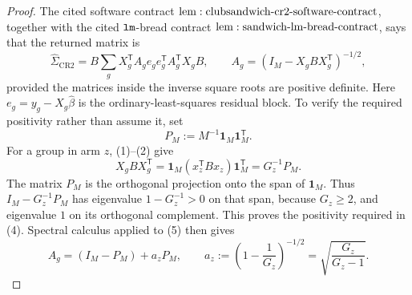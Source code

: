 \documentclass{article}
\begin{document}
\begin{proof}
The cited software contract \({\rm lem:clubsandwich\text{-}cr2\text{-}software\text{-}contract}\), together with the cited \({\tt lm}\)-bread contract \({\rm lem:sandwich\text{-}lm\text{-}bread\text{-}contract}\), says that the returned matrix is
\[
 \widehat\Sigma_{\mathrm{CR2}}
 =B\sum_gX_g^{\mathsf T}A_ge_ge_g^{\mathsf T}A_g^{\mathsf T}X_gB,
 \qquad
 A_g=\left(I_M-X_gBX_g^{\mathsf T}\right)^{-1/2},
 \tag{4}
\]
provided the matrices inside the inverse square roots are positive definite.  Here \(e_g=y_g-X_g\widehat\beta\) is the ordinary-least-squares residual block.  To verify the required positivity rather than assume it, set
\[
 P_M:=M^{-1}\mathbf 1_M\mathbf 1_M^{\mathsf T}.
\]
For a group in arm \(z\), (1)--(2) give
\[
 X_gBX_g^{\mathsf T}
 =\mathbf 1_M(x_z^{\mathsf T}Bx_z)\mathbf 1_M^{\mathsf T}
 =G_z^{-1}P_M.
 \tag{5}
\]
The matrix \(P_M\) is the orthogonal projection onto the span of \(\mathbf 1_M\).  Thus \(I_M-G_z^{-1}P_M\) has eigenvalue \(1-G_z^{-1}>0\) on that span, because \(G_z\ge2\), and eigenvalue \(1\) on its orthogonal complement.  This proves the positivity required in (4).  Spectral calculus applied to (5) then gives
\[
 A_g=(I_M-P_M)+a_zP_M,
 \qquad
 a_z:=\left(1-\frac1{G_z}\right)^{-1/2}
 =\sqrt{\frac{G_z}{G_z-1}}.
 \tag{6}
\]


\end{proof}
\end{document}
